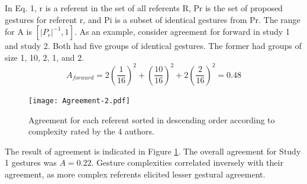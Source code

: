 \documentclass{sigchi}
\begin{document}
In Eq. 1, r is a referent in the set of all referents R, Pr is the set of proposed gestures for referent r, and Pi is a subset of identical gestures from Pr. The range for A is $\left[\lvert{P_r}\rvert ^{-1}, 1\right]$. As an example, consider agreement for forward in study 1 and study 2. Both had five groups of identical gestures. The former had groups of size 1, 10, 2, 1, and 2.
\begin{equation}
   A_{forward} = 2\left(\frac{1}{16}\right) ^ 2  + \left(\frac{10}{16}\right) ^ 2 + 2\left(\frac{2}{16}\right) ^ 2 = 0.48
\end{equation}



\begin{figure}[!h]
\centering
\texttt{[image: Agreement-2.pdf]}
\caption{Agreement for each referent sorted in descending order according to complexity rated by the 4 authors.}
\label{fig:agreementFigure}
\end{figure}

The result of agreement is indicated in Figure \ref{fig:agreementFigure}. The overall agreement for Study 1 gestures was $A=0.22$. Gesture complexities correlated inversely with their agreement, as more complex referents elicited lesser gestural agreement.
\end{document}
